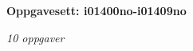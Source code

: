 \centerline{\bf Oppgavesett: i01400no-i01409no}
\vskip 10pt
\centerline{\it 10 oppgaver}\vskip 10pt
\vskip 10pt
